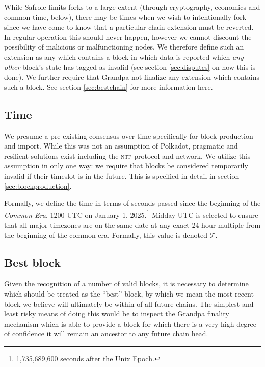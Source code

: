While Safrole limits forks to a large extent (through cryptography, economics and common-time, below), there may be times when we wish to intentionally fork since we have come to know that a particular chain extension must be reverted. In regular operation this should never happen, however we cannot discount the possibility of malicious or malfunctioning nodes. We therefore define such an extension as any which contains a block in which data is reported which \emph{any other} block's state has tagged as invalid (see section \ref{sec:disputes} on how this is done). We further require that Grandpa not finalize any extension which contains such a block. See section \ref{sec:bestchain} for more information here.

\subsection{Time}\label{sec:commonera}

We presume a pre-existing consensus over time specifically for block production and import. While this was not an assumption of Polkadot, pragmatic and resilient solutions exist including the \textsc{ntp} protocol and network. We utilize this assumption in only one way: we require that blocks be considered temporarily invalid if their timeslot is in the future. This is specified in detail in section \ref{sec:blockproduction}.

Formally, we define the time in terms of seconds passed since the beginning of the \Jam\emph{Common Era}, 1200 UTC on January 1, 2025.\footnote{1,735,689,600 seconds after the Unix Epoch.} Midday UTC is selected to ensure that all major timezones are on the same date at any exact 24-hour multiple from the beginning of the common era. Formally, this value is denoted $\mathcal{T}$.

\subsection{Best block}

Given the recognition of a number of valid blocks, it is necessary to determine which should be treated as the ``best'' block, by which we mean the most recent block we believe will ultimately be within of all future \Jam chains. The simplest and least risky means of doing this would be to inspect the Grandpa finality mechanism which is able to provide a block for which there is a very high degree of confidence it will remain an ancestor to any future chain head.

